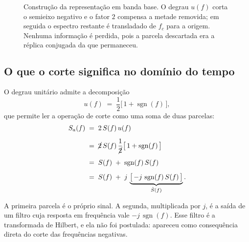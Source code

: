 \documentclass[11pt,a4paper]{article}
\DeclareMathOperator{\sgn}{sgn}
\begin{document}
\begin{figure}[H]
\caption{Construção da representação em banda base. O degrau $u(f)$ corta o semieixo negativo e o fator $2$ compensa a metade removida; em seguida o espectro restante é transladado de $f_c$ para a origem. Nenhuma informação é perdida, pois a parcela descartada era a réplica conjugada da que permaneceu.}
\label{fig:corte_desloca}
\end{figure}

\subsection{O que o corte significa no domínio do tempo}

O degrau unitário admite a decomposição
\begin{equation}
  u(f) \;=\; \frac{1}{2}\bigl[\,1 + \sgn(f)\,\bigr],
  \label{eq:degrau_sgn}
\end{equation}
que permite ler a operação de corte como uma soma de duas parcelas:
\begin{align}
  S_a(f) &\;=\; 2\,S(f)\,u(f)
  \label{eq:analitico_passo1}\\[0.5em]
         &\;=\; \cancel{2}\,S(f)\,\frac{1}{\cancel{2}}\bigl[\,1+\sgn(f)\,\bigr]
  \label{eq:analitico_passo2}\\[0.5em]
         &\;=\; S(f) \;+\; \sgn(f)\,S(f)
  \label{eq:analitico_passo3}\\[0.5em]
         &\;=\; S(f) \;+\; j\,\underbrace{\bigl[\,-j\,\sgn(f)\,S(f)\,\bigr]}_{\hat{S}(f)} .
  \label{eq:analitico_passo4}
\end{align}

A primeira parcela é o próprio sinal. A segunda, multiplicada por $j$, é a saída de um filtro cuja resposta em frequência vale $-j\,\sgn(f)$. Esse filtro é a transformada de Hilbert, e ela não foi postulada: apareceu como consequência direta do corte das frequências negativas.
\end{document}

